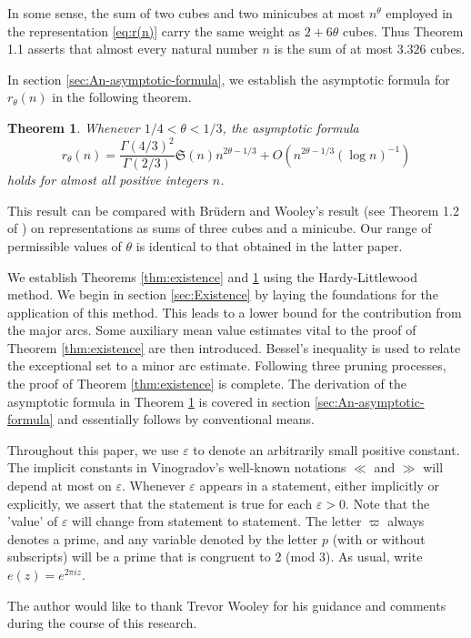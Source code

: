 \documentclass[12pt,english,reqno]{amsart}
\theoremstyle{definition}
\theoremstyle{remark}
\numberwithin{equation}{section}
\numberwithin{equation}{section}
\numberwithin{figure}{section}
\theoremstyle{plain}
\newtheorem{thm}{Theorem}[section]
\theoremstyle{plain}
\theoremstyle{plain}
\theoremstyle{plain}
\numberwithin{equation}{section}
\numberwithin{thm}{section}
\begin{document}
In some sense, the sum of two cubes and two minicubes at most $n^{\theta}$
employed in the representation \eqref{eq:r(n)} carry the same weight
as $2+6\theta$ cubes. Thus Theorem 1.1 asserts that almost every
natural number $n$ is the sum of at most $3.326$ cubes.
\par In section \ref{sec:An-asymptotic-formula}, we establish the asymptotic
formula for $r_{\theta}(n)$ in the following theorem.
\begin{thm}
\label{thm:asymptotic}Whenever $1/4<\theta<1/3$, the asymptotic
formula
\begin{equation}
r_{\theta}(n)=\frac{\Gamma(4/3)^{2}}{\Gamma(2/3)}\mathfrak{S}(n)n^{2\theta-1/3}+O(n^{2\theta-1/3}(\log n)^{-1})\end{equation}
holds for almost all positive integers $n$.
\end{thm}
\par This result can be compared with Br\"{u}dern and Wooley's result (see
Theorem 1.2 of \cite{BrudernWooley2009}) on representations as sums
of three cubes and a minicube. Our range of permissible values of
$\theta$ is identical to that obtained in the latter paper.
\par We establish Theorems \ref{thm:existence} and \ref{thm:asymptotic}
using the Hardy-Littlewood method. We begin in section \ref{sec:Existence}
by laying the foundations for the application of this method. This
leads to a lower bound for the contribution from the major arcs. Some
auxiliary mean value estimates vital to the proof of Theorem \ref{thm:existence}
are then introduced. Bessel's inequality is used to relate the exceptional
set to a minor arc estimate. Following three pruning processes, the
proof of Theorem \ref{thm:existence} is complete. The derivation
of the asymptotic formula in Theorem \ref{thm:asymptotic} is covered
in section \ref{sec:An-asymptotic-formula} and essentially follows
by conventional means. 
\par Throughout this paper, we use $ $$\varepsilon$ to denote an arbitrarily
small positive constant. The implicit constants in Vinogradov's well-known
notations $\ll$ and $\gg$ will depend at most on $\varepsilon$.
Whenever $\varepsilon$ appears in a statement, either implicitly
or explicitly, we assert that the statement is true for each $\varepsilon>0$.
Note that the 'value' of $\varepsilon$ will change from statement
to statement. The letter $\varpi$ always denotes a prime, and any
variable denoted by the letter $p$ (with or without subscripts) will
be a prime that is congruent to 2 (mod 3). As usual, write $e(z)=e^{2\pi iz}$.
\par The author would like to thank Trevor Wooley for his guidance and
comments during the course of this research.
\end{document}

